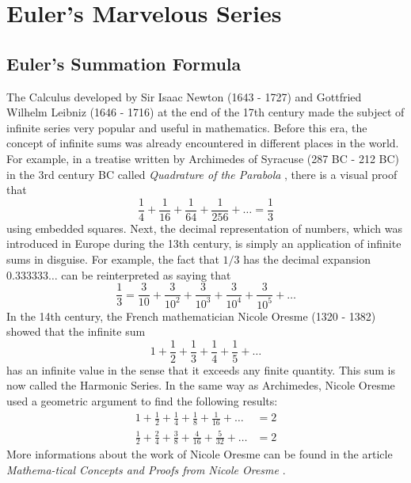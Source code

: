 \chapter{Euler's Marvelous Series}



\section{Euler's Summation Formula} \label{sec:summation formula}

The Calculus developed by Sir Isaac Newton (1643 - 1727) and Gottfried Wilhelm Leibniz (1646 - 1716) at the end of the 17th century made the subject of infinite series very popular and useful in mathematics. Before this era, the concept of infinite sums was already encountered in different places in the world. For example, in a treatise written by Archimedes of Syracuse (287 BC - 212 BC) in the 3rd century BC called \textit{Quadrature of the Parabola} \cite{archimedes1897}, there is a visual proof that
$$\frac{1}{4} + \frac{1}{16} + \frac{1}{64} + \frac{1}{256} + \dots = \frac{1}{3}$$
using embedded squares. Next, the decimal representation of numbers, which was introduced in Europe during the 13th century, is simply an application of infinite sums in disguise. For example, the fact that $1/3$ has the decimal expansion $0.333333\dots$ can be reinterpreted as saying that
$$\frac{1}{3} = \frac{3}{10} + \frac{3}{10^2} + \frac{3}{10^3} + \frac{3}{10^4} + \frac{3}{10^5} + \dots$$
In the 14th century, the French mathematician Nicole Oresme (1320 - 1382) showed that the infinite sum 
$$1 + \frac{1}{2} + \frac{1}{3} + \frac{1}{4} + \frac{1}{5} + \dots$$
has an infinite value in the sense that it exceeds any finite quantity. This sum is now called the Harmonic Series. In the same way as Archimedes, Nicole Oresme used a geometric argument to find the following results:
\begin{align*}
    1 + \frac{1}{2} + \frac{1}{4} + \frac{1}{8} + \frac{1}{16} + \dots &= 2 \\
    \frac{1}{2} + \frac{2}{4} + \frac{3}{8} + \frac{4}{16} + \frac{5}{32} + \dots &= 2
\end{align*}
More informations about the work of Nicole Oresme can be found in the article \textit{Mathema-tical Concepts and Proofs from Nicole Oresme} \cite{NicoleOresme}. 

